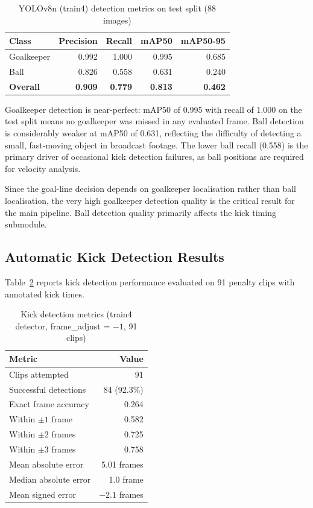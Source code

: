 \documentclass[12pt,a4paper,twoside]{article}
\begin{document}
\begin{table}[H]
  \centering
  \caption{YOLOv8n (train4) detection metrics on test split (88 images)}
  \label{tab:yolo_detection}
  \begin{tabular}{lrrrr}
    \toprule
    Class & Precision & Recall & mAP50 & mAP50-95 \\
    \midrule
    Goalkeeper & 0.992 & 1.000 & 0.995 & 0.685 \\
    Ball       & 0.826 & 0.558 & 0.631 & 0.240 \\
    \midrule
    \textbf{Overall} & \textbf{0.909} & \textbf{0.779} & \textbf{0.813} & \textbf{0.462} \\
    \bottomrule
  \end{tabular}
\end{table}

Goalkeeper detection is near-perfect: mAP50 of 0.995 with recall of 1.000
on the test split means no goalkeeper was missed in any evaluated frame.
Ball detection is considerably weaker at mAP50 of 0.631, reflecting the
difficulty of detecting a small, fast-moving object in broadcast footage.
The lower ball recall (0.558) is the primary driver of occasional kick
detection failures, as ball positions are required for velocity analysis.

Since the goal-line decision depends on goalkeeper localisation rather than
ball localisation, the very high goalkeeper detection quality is the critical
result for the main pipeline. Ball detection quality primarily affects the
kick timing submodule.

\subsection{Automatic Kick Detection Results}

Table~\ref{tab:kick_detection} reports kick detection performance evaluated
on 91 penalty clips with annotated kick times.

\begin{table}[H]
  \centering
  \caption{Kick detection metrics (train4 detector, frame\_adjust = $-1$, 91 clips)}
  \label{tab:kick_detection}
  \begin{tabular}{lr}
    \toprule
    Metric & Value \\
    \midrule
    Clips attempted & 91 \\
    Successful detections & 84 (92.3\%) \\
    Exact frame accuracy & 0.264 \\
    Within $\pm 1$ frame & 0.582 \\
    Within $\pm 2$ frames & 0.725 \\
    Within $\pm 3$ frames & 0.758 \\
    Mean absolute error & 5.01 frames \\
    Median absolute error & 1.0 frame \\
    Mean signed error & $-2.1$ frames \\
    \bottomrule
  \end{tabular}
\end{table}
\end{document}

